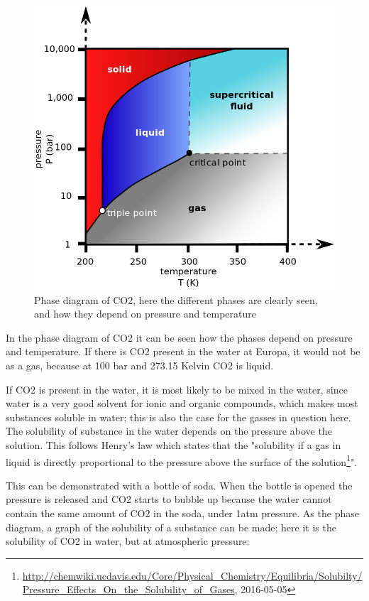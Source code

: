 \begin{figure}[htb]
  \centering
  \includegraphics[scale=0.4]{figures/GasDetectionAgge/CO2PhaseDiagram}
  \caption{Phase diagram of CO2, here the different phases are clearly seen, and how they depend on pressure and temperature}
\end{figure}

In the phase diagram of CO2 it can be seen how the phases depend on pressure and temperature. If there is CO2 present in the water at Europa, it would not be as a gas, because at 100 bar and 273.15 Kelvin CO2 is liquid.

If CO2 is present in the water, it is most likely to be mixed in the water, since water is a very good solvent for ionic and organic compounds, which makes most substances soluble in water; this is also the case for the gasses in question here. The solubility of substance in the water depends on the pressure above the solution. This follows Henry's law which states that the "solubility if a gas in liquid is directly proportional to the pressure above the surface of the solution\footnote{\url{http://chemwiki.ucdavis.edu/Core/Physical_Chemistry/Equilibria/Solubilty/Pressure_Effects_On_the_Solubility_of_Gases}, 2016-05-05}".

This can be demonstrated with a bottle of soda. When the bottle is opened the pressure is released and CO2 starts to bubble up because the water cannot contain the same amount of CO2 in the soda, under 1atm pressure.
As the phase diagram, a graph of the solubility of a substance can be made; here it is the solubility of CO2 in water, but at atmospheric pressure:

